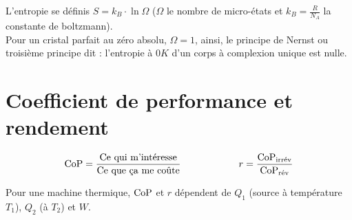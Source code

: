 \documentclass[13pt, twoside, a4paper, french]{report}
\begin{document}
            L'entropie se définis $S = k_B \cdot \ln \Omega$ ($\Omega$ le nombre de micro-états et $k_B = \frac{R}{N_A}$ la constante de boltzmann).\\

            Pour un cristal parfait au zéro absolu, $\Omega = 1$, ainsi, le principe de Nernst ou troisième principe dit : l'entropie à $0K$ d'un corps à complexion unique est nulle.

        \section{Coefficient de performance et rendement}

            \[\textrm{CoP} = \dfrac{\textrm{Ce qui m'intéresse}}{\textrm{Ce que ça me coûte}} \hspace{60pt} r = \dfrac{\textrm{CoP}_\textrm{irrév}}{\textrm{CoP}_\textrm{rév}}\]

            Pour une machine thermique, $\textrm{CoP}$ et $r$ dépendent de $Q_1$ (source à température $T_1$), $Q_2$ (à $T_2$) et $W$.
\end{document}

